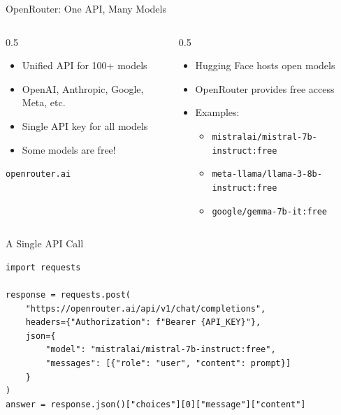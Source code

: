 \documentclass[aspectratio=169]{beamer}
\begin{document}
\begin{frame}{OpenRouter: One API, Many Models}
\begin{columns}[T]
\begin{column}{0.5\textwidth}
\begin{shadedbox}[title=\textbf{What is OpenRouter?}]
\begin{itemize}\small
  \item Unified API for 100+ models
  \item OpenAI, Anthropic, Google, Meta, etc.
  \item Single API key for all models
  \item Some models are free!
\end{itemize}
\end{shadedbox}
\vspace{0.3cm}
\begin{center}
\texttt{openrouter.ai}
\end{center}
\end{column}
\begin{column}{0.5\textwidth}
\begin{shadedbox}[title=\textbf{Free Models on Hugging Face}]
\begin{itemize}\small
  \item Hugging Face hosts open models
  \item OpenRouter provides free access
  \item Examples:
  \begin{itemize}\footnotesize
    \item \texttt{mistralai/mistral-7b-instruct:free}
    \item \texttt{meta-llama/llama-3-8b-instruct:free}
    \item \texttt{google/gemma-7b-it:free}
  \end{itemize}
\end{itemize}
\end{shadedbox}
\end{column}
\end{columns}
\end{frame}

\begin{frame}[fragile]{A Single API Call}
\begin{shadedbox}[title=\textbf{Basic Structure}]
\begin{verbatim}
import requests

response = requests.post(
    "https://openrouter.ai/api/v1/chat/completions",
    headers={"Authorization": f"Bearer {API_KEY}"},
    json={
        "model": "mistralai/mistral-7b-instruct:free",
        "messages": [{"role": "user", "content": prompt}]
    }
)
answer = response.json()["choices"][0]["message"]["content"]
\end{verbatim}
\end{shadedbox}
\end{frame}
\end{document}
